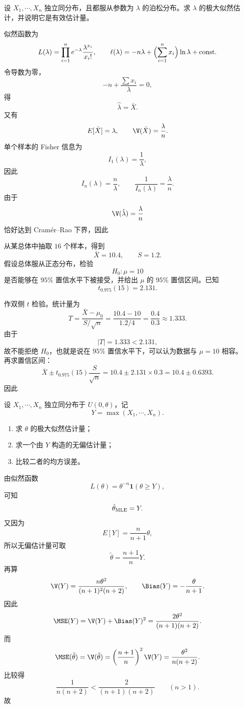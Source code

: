 \begin{question}
设 $X_1,\cdots,X_n$ 独立同分布，且都服从参数为 $\lambda$ 的泊松分布。求 $\lambda$ 的极大似然估计，并说明它是有效估计量。
\begin{solution}
似然函数为
\[
L(\lambda)=\prod_{i=1}^n e^{-\lambda}\frac{\lambda^{x_i}}{x_i!},
\qquad
\ell(\lambda)=-n\lambda+\Bigl(\sum_{i=1}^n x_i\Bigr)\ln\lambda+\text{const}.
\]
令导数为零，
\[
-n+\frac{\sum x_i}{\lambda}=0,
\]
得
\[
\hat\lambda=\bar X.
\]
又有
\[
E[\bar X]=\lambda,\qquad \V(\bar X)=\frac{\lambda}{n}.
\]
单个样本的 Fisher 信息为
\[
I_1(\lambda)=\frac{1}{\lambda},
\]
因此
\[
I_n(\lambda)=\frac{n}{\lambda},
\qquad
\frac{1}{I_n(\lambda)}=\frac{\lambda}{n}.
\]
由于
\[
\V(\hat\lambda)=\frac{\lambda}{n}
\]
恰好达到 Cram\'er--Rao 下界，因此
\end{solution}
\end{question}

\begin{question}
从某总体中抽取 $16$ 个样本，得到
\[
\bar X=10.4,\qquad S=1.2.
\]
假设总体服从正态分布，检验
\[
H_0:\mu=10
\]
是否能够在 $95\%$ 置信水平下被接受，并给出 $\mu$ 的 $95\%$ 置信区间。已知
\[
t_{0.975}(15)=2.131.
\]
\begin{solution}
作双侧 $t$ 检验。统计量为
\[
T=\frac{\bar X-\mu_0}{S/\sqrt{n}}
=\frac{10.4-10}{1.2/4}
=\frac{0.4}{0.3}
\approx 1.333.
\]
由于
\[
|T|=1.333<2.131,
\]
故不能拒绝 $H_0$，也就是说在 $95\%$ 置信水平下，可以认为数据与 $\mu=10$ 相容。
再求置信区间：
\[
\bar X\pm t_{0.975}(15)\frac{S}{\sqrt{n}}
=10.4\pm 2.131\times 0.3
=10.4\pm 0.6393.
\]
因此
\end{solution}
\end{question}

\begin{question}
设 $X_1,\cdots,X_n$ 独立同分布于 $U(0,\theta)$，记
\[
Y=\max(X_1,\cdots,X_n).
\]
\begin{enumerate}
\item 求 $\theta$ 的极大似然估计量；
\item 求一个由 $Y$ 构造的无偏估计量；
\item 比较二者的均方误差。
\end{enumerate}
\begin{solution}
由似然函数
\[
L(\theta)=\theta^{-n}\mathbf 1(\theta\ge Y),
\]
可知
\[
\hat\theta_{\rm MLE}=Y.
\]
又因为
\[
E[Y]=\frac{n}{n+1}\theta,
\]
所以无偏估计量可取
\[
\tilde\theta=\frac{n+1}{n}Y.
\]
再算
\[
\V(Y)=\frac{n\theta^2}{(n+1)^2(n+2)},
\qquad
\Bias(Y)=-\frac{\theta}{n+1}.
\]
因此
\[
\MSE(Y)=\V(Y)+\Bias(Y)^2
=\frac{2\theta^2}{(n+1)(n+2)}.
\]
而
\[
\MSE(\tilde\theta)=\V(\tilde\theta)
=\left(\frac{n+1}{n}\right)^2\V(Y)
=\frac{\theta^2}{n(n+2)}.
\]
比较得
\[
\frac{1}{n(n+2)}<\frac{2}{(n+1)(n+2)}\qquad (n>1).
\]
故
\end{solution}
\end{question}

